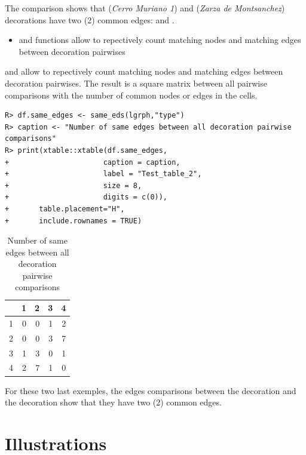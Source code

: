 \documentclass[article]{jss}\usepackage{knitr}
\begin{document}
The comparison shows that  (\emph{Cerro Muriano 1}) and  (\emph{Zarza de Montsanchez}) decorations have two (2) common edges:  and .

\begin{itemize}
\setlength\itemsep{.1em}
  \item {} and  functions allow to repectively count matching nodes and matching edges between decoration pairwises
\end{itemize}

 and  allow to repectively count matching nodes and matching edges between decoration pairwises. The result is a square matrix between all pairwise comparisons with the number of common nodes or edges in the cells.

\begin{kframe}
\begin{verbatim}
R> df.same_edges <- same_eds(lgrph,"type")
R> caption <- "Number of same edges between all decoration pairwise comparisons"
R> print(xtable::xtable(df.same_edges,
+                      caption = caption,
+                      label = "Test_table_2",
+                      size = 8,
+                      digits = c(0)),
+       table.placement="H",
+       include.rownames = TRUE)
\end{verbatim}
\end{kframe}%
\begin{table}[H]
\centering
\begin{tabular}{rrrrr}
  \hline
 & 1 & 2 & 3 & 4 \\ 
  \hline
1 & 0 & 0 & 1 & 2 \\ 
  2 & 0 & 0 & 3 & 7 \\ 
  3 & 1 & 3 & 0 & 1 \\ 
  4 & 2 & 7 & 1 & 0 \\ 
   \hline
\end{tabular}
\caption{Number of same edges between all decoration pairwise comparisons} 
\label{Test_table_2}
\end{table}


For these two last exemples, the edges comparisons between the decoration  and the decoration  show that they have two (2) common edges.

\section{Illustrations} \label{sec:illustrations}
\end{document}
